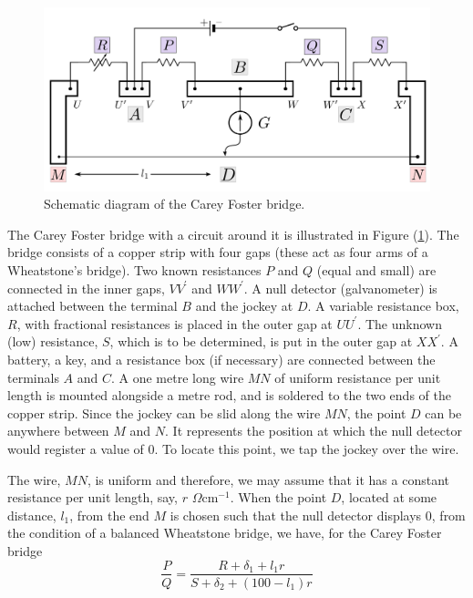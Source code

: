 \begin{figure}[!htb]
    \centering
    \includegraphics[width=\textwidth]{figs/carey.png}
    \caption{Schematic diagram of the Carey Foster bridge.}
    \label{fig:carey}
\end{figure}

The Carey Foster bridge with a circuit around it is illustrated in Figure (\ref{fig:carey}).
The bridge consists of a copper strip with four gaps (these act as four arms of a Wheatstone’s bridge). Two known resistances $P$ and $Q$ (equal and small) are connected in the inner gaps, $VV^{\prime}$ and $WW^{\prime}$. A null detector (galvanometer) is attached between the terminal $B$ and the jockey at $D$. A variable resistance box, $R$, with fractional resistances is placed in the outer gap at $UU^{\prime}$. The unknown (low) resistance, $S$, which is to be determined, is put in the 
outer gap at $XX^{\prime}$. A battery, a key, and a resistance box (if necessary) are connected between the terminals $A$ and $C$. A one metre long wire $MN$ of uniform resistance per unit length is mounted alongside a metre rod, and is soldered to the two ends of the copper strip. Since the jockey can be slid along the wire $MN$, the point $D$ can be anywhere between $M$ and $N$. It represents the position at which the null detector would register a value of 0. To locate this point, we tap the jockey over the wire. 

The wire, $MN$, is uniform and therefore, we may assume that it has a constant resistance per unit length, say, $r$ $\Omega$cm$^{-1}$. When the point $D$, located at some distance, $l_1$, from the end $M$ is chosen such that the null detector displays $0$, from the condition of a balanced Wheatstone bridge, we have, for the Carey Foster bridge 
\begin{equation}
\frac{P}{Q}=\frac{R+\delta_{1}+l_{1}r}{S+\delta_{2}+(100-l_{1})r}
\label{careyconfig1}
\end{equation}

